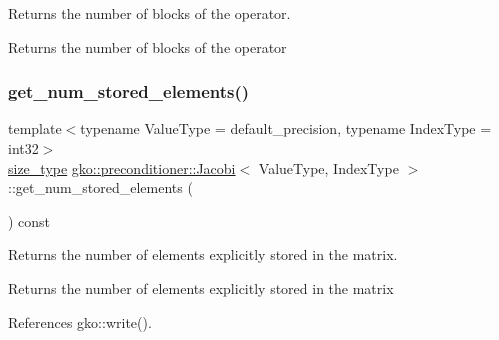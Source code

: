 Returns the number of blocks of the operator. 

\begin{DoxyReturn}{Returns}
the number of blocks of the operator 
\end{DoxyReturn}
\mbox{\label{classgko_1_1preconditioner_1_1Jacobi_af238130016f4534089edfb95918f14d1}} 
\subsubsection{\texorpdfstring{get\+\_\+num\+\_\+stored\+\_\+elements()}{get\_num\_stored\_elements()}}
{\footnotesize\ttfamily template$<$typename Value\+Type  = default\+\_\+precision, typename Index\+Type  = int32$>$ \\
\hyperlink{namespacegko_a6e5c95df0ae4e47aab2f604a22d98ee7}{size\+\_\+type} \hyperlink{classgko_1_1preconditioner_1_1Jacobi}{gko\+::preconditioner\+::\+Jacobi}$<$ Value\+Type, Index\+Type $>$\+::get\+\_\+num\+\_\+stored\+\_\+elements (\begin{DoxyParamCaption}{ }\end{DoxyParamCaption}) const\hspace{0.3cm}{\ttfamily [noexcept]}}



Returns the number of elements explicitly stored in the matrix. 

\begin{DoxyReturn}{Returns}
the number of elements explicitly stored in the matrix 
\end{DoxyReturn}


References gko\+::write().

\mbox{\label{classgko_1_1preconditioner_1_1Jacobi_a5e4e792eebc837d555c2df4c74a3d5dc}} 
